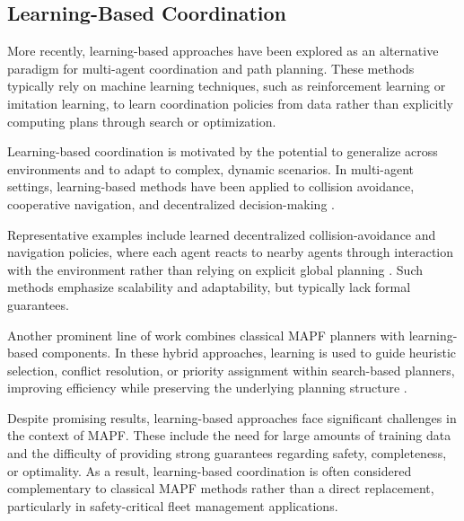 \subsection{Learning-Based Coordination}
\label{subsec:learning_mapf}
\hspace{\parindent}
More recently, learning-based approaches have been explored as an alternative paradigm for multi-agent coordination and path planning. These methods typically rely on machine learning techniques, such as reinforcement learning or imitation learning, to learn coordination policies from data rather than explicitly computing plans through search or optimization.

Learning-based coordination is motivated by the potential to generalize across environments and to adapt to complex, dynamic scenarios. In multi-agent settings, learning-based methods have been applied to collision avoidance, cooperative navigation, and decentralized decision-making \cite{junyan2020exploration, kulathunga2021learning}.

Representative examples include learned decentralized collision-avoidance and navigation policies, where each agent reacts to nearby agents through interaction with the environment rather than relying on explicit global planning \cite{everett2021collision}. Such methods emphasize scalability and adaptability, but typically lack formal guarantees.

Another prominent line of work combines classical MAPF planners with learning-based components. In these hybrid approaches, learning is used to guide heuristic selection, conflict resolution, or priority assignment within search-based planners, improving efficiency while preserving the underlying planning structure \cite{junyan2020exploration}.

Despite promising results, learning-based approaches face significant challenges in the context of MAPF. These include the need for large amounts of training data and the difficulty of providing strong guarantees regarding safety, completeness, or optimality. As a result, learning-based coordination is often considered complementary to classical MAPF methods rather than a direct replacement, particularly in safety-critical fleet management applications.


